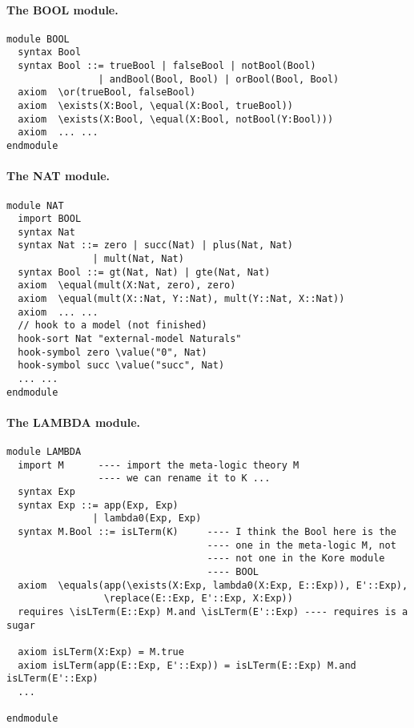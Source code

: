\documentclass[UTF8]{article}
\theoremstyle{plain}
\theoremstyle{definition}
\theoremstyle{remark}
\begin{document}
\paragraph{The {\small BOOL} module.}\quad
\begin{Verbatim}
module BOOL
  syntax Bool
  syntax Bool ::= trueBool | falseBool | notBool(Bool)
                | andBool(Bool, Bool) | orBool(Bool, Bool)
  axiom  \or(trueBool, falseBool)
  axiom  \exists(X:Bool, \equal(X:Bool, trueBool))
  axiom  \exists(X:Bool, \equal(X:Bool, notBool(Y:Bool)))
  axiom  ... ...
endmodule
\end{Verbatim}

\paragraph{The {\small NAT} module.}\quad  
\begin{Verbatim}
module NAT
  import BOOL
  syntax Nat
  syntax Nat ::= zero | succ(Nat) | plus(Nat, Nat) 
               | mult(Nat, Nat)
  syntax Bool ::= gt(Nat, Nat) | gte(Nat, Nat)
  axiom  \equal(mult(X:Nat, zero), zero)
  axiom  \equal(mult(X::Nat, Y::Nat), mult(Y::Nat, X::Nat))
  axiom  ... ...
  // hook to a model (not finished)
  hook-sort Nat "external-model Naturals"
  hook-symbol zero \value("0", Nat)
  hook-symbol succ \value("succ", Nat)
  ... ...
endmodule
\end{Verbatim}

\paragraph{The {\small LAMBDA} module.}\quad
\begin{Verbatim}
module LAMBDA
  import M      ---- import the meta-logic theory M
                ---- we can rename it to K ...
  syntax Exp
  syntax Exp ::= app(Exp, Exp)
               | lambda0(Exp, Exp)
  syntax M.Bool ::= isLTerm(K)     ---- I think the Bool here is the
                                   ---- one in the meta-logic M, not
                                   ---- not one in the Kore module 
                                   ---- BOOL
  axiom  \equals(app(\exists(X:Exp, lambda0(X:Exp, E::Exp)), E'::Exp),
                 \replace(E::Exp, E'::Exp, X:Exp))
  requires \isLTerm(E::Exp) M.and \isLTerm(E'::Exp) ---- requires is a sugar
  
  axiom isLTerm(X:Exp) = M.true
  axiom isLTerm(app(E::Exp, E'::Exp)) = isLTerm(E::Exp) M.and isLTerm(E'::Exp)
  ...
      
endmodule
\end{Verbatim}
\end{document}
